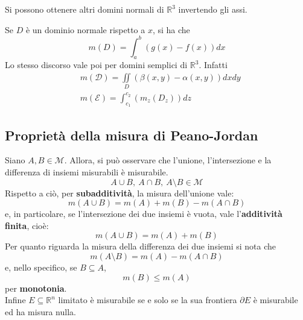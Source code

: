     \begin{oss}
        Si possono ottenere altri domini normali di $\mathbb{R}^3$ invertendo gli assi.
    \end{oss}
    \begin{oss}
        Se $D$ è un dominio normale rispetto a $x$, si ha che
        \begin{equation*}
            m(D)= \int_a^b(g(x)-f(x))dx
        \end{equation*}
        Lo stesso discorso vale poi per domini semplici di $\mathbb{R}^3$. Infatti
        \begin{equation*}
            \begin{aligned}
                &m(\mathcal{D})=\iint\limits_D(\beta(x,y)-\alpha(x,y))dxdy\\
                &m(\mathcal{E})=\int_{c_1}^{c_2}(m_z(D_z))dz
            \end{aligned}
        \end{equation*}
    \end{oss}
    \subsection{Proprietà della misura di Peano-Jordan}
    Siano $A, B \in \mathcal{M}$. Allora, si può osservare che l'unione, l'intersezione e la differenza di insiemi misurabili è misurabile.
    \begin{equation*}
        A \cup B,\ A \cap B,\ A \setminus B \in \mathcal{M}
    \end{equation*}
    Rispetto a ciò, per \textbf{subadditività}, la misura dell'unione vale:
    \begin{equation*}
        m(A \cup B) = m(A)+ m(B)- m(A \cap B)
    \end{equation*}
    e, in particolare, se l'intersezione dei due insiemi è vuota, vale l'\textbf{additività finita}, cioè:
    \begin{equation*}
        m(A \cup B) = m(A)+ m(B)
    \end{equation*}
    Per quanto riguarda la misura della differenza dei due insiemi si nota che 
    \begin{equation*}
        m(A \setminus B)= m(A)-m(A \cap B)
    \end{equation*}
    e, nello specifico, se $B \subseteq A$,
    \begin{equation*}
        m(B) \leq m(A)
    \end{equation*}
    per \textbf{monotonia}.\\
    Infine $E \subseteq \mathbb{R}^n$ limitato è misurabile se e solo se la sua frontiera $\partial E$ è misurabile ed ha misura nulla.
